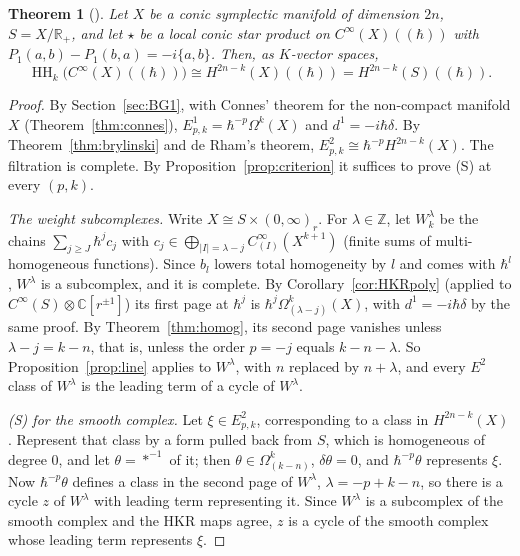 \documentclass[11pt,oneside,reqno]{article}
\DeclareMathOperator{\HH}{HH}
\newcommand{\C}{\mathbb C}
\newcommand{\R}{\mathbb R}
\newcommand{\Z}{\mathbb Z}
\newcommand{\CI}{C^\infty}
\newcommand{\Om}{\Omega}
\newcommand{\hb}{\hbar}
\newcommand{\Lser}[1]{(\!(#1)\!)}
\theoremstyle{plain}
\newtheorem{theorem}{Theorem}[section]
\theoremstyle{definition}
\theoremstyle{remark}
\begin{document}
\begin{theorem}[{\cite[\S2, Theorem and Corollary]{BG}}]\label{thm:smoothquantum}
Let \(X\) be a conic symplectic manifold of dimension \(2n\), \(S=X/\R_+\), and let
\(\star\) be a local conic star product on \(\CI(X)\Lser{\hb}\) with
\(P_1(a,b)-P_1(b,a)=-i\{a,b\}\). Then, as \(K\)-vector spaces,
\[
 \HH_k\bigl(\CI(X)\Lser{\hb}\bigr)\cong H^{2n-k}(X)\Lser{\hb}=H^{2n-k}(S)\Lser{\hb}.
\]
\end{theorem}

\begin{proof}
By Section~\ref{sec:BG1}, with Connes' theorem for the non-compact manifold \(X\)
(Theorem~\ref{thm:connes}), \(E^1_{p,k}=\hb^{-p}\Om^k(X)\) and \(d^1=-i\hb\delta\). By
Theorem~\ref{thm:brylinski} and de Rham's theorem,
\(E^2_{p,k}\cong\hb^{-p}H^{2n-k}(X)\). The filtration is complete. By
Proposition~\ref{prop:criterion} it suffices to prove (S) at every \((p,k)\).

\emph{The weight subcomplexes.} Write \(X\cong S\times(0,\infty)_r\). For \(\lambda\in\Z\),
let \(W^\lambda_k\) be the chains \(\sum_{j\ge J}\hb^jc_j\) with
\(c_j\in\bigoplus_{|I|=\lambda-j}\CI_{(I)}(X^{k+1})\) (finite sums of multi-homogeneous
functions). Since \(b_l\) lowers total homogeneity by \(l\) and comes with \(\hb^l\),
\(W^\lambda\) is a subcomplex, and it is complete. By Corollary~\ref{cor:HKRpoly}
(applied to \(\CI(S)\otimes\C[r^{\pm1}]\)) its first page at \(\hb^j\) is
\(\hb^j\Om^k_{(\lambda-j)}(X)\), with \(d^1=-i\hb\delta\) by the same proof. By
Theorem~\ref{thm:homog}, its second page vanishes unless \(\lambda-j=k-n\), that is,
unless the order \(p=-j\) equals \(k-n-\lambda\). So Proposition~\ref{prop:line}
applies to \(W^\lambda\), with \(n\) replaced by \(n+\lambda\), and every \(E^2\) class of
\(W^\lambda\) is the leading term of a cycle of \(W^\lambda\).

\emph{(S) for the smooth complex.} Let \(\xi\in E^2_{p,k}\), corresponding to a class
in \(H^{2n-k}(X)\). Represent that class by a form pulled back from \(S\), which
is homogeneous of degree \(0\), and let \(\theta=*^{-1}\) of it; then
\(\theta\in\Om^k_{(k-n)}\), \(\delta\theta=0\), and \(\hb^{-p}\theta\) represents \(\xi\). Now
\(\hb^{-p}\theta\) defines a class in the second page of \(W^\lambda\),
\(\lambda=-p+k-n\), so there is a cycle \(z\) of \(W^\lambda\) with leading term
representing it. Since \(W^\lambda\) is a subcomplex of the smooth complex and
the HKR maps agree, \(z\) is a cycle of the smooth complex whose leading term
represents \(\xi\).


\end{proof}
\end{document}
